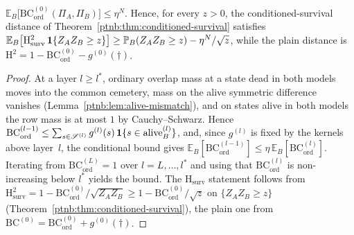 \begin{theoremenv}\label{ptnb:thm:rand-adf}\label{thm:rand_stopping}
$\mathbb{E}_B\bigl[\mathrm{BC}^{(0)}_{\mathrm{ord}}(\Pi_A, \Pi_B)\bigr] \leq \eta^{N}$.  Hence, for
every $z > 0$, the conditioned-survival distance of Theorem~\ref{ptnb:thm:conditioned-survival}
satisfies $\mathbb{E}_B\bigl[\mathrm{H}^2_{\mathrm{surv}}\,\mathbf{1}\{Z_A Z_B \allowbreak \geq z\}\bigr] \geq
    \mathbb{P}_B(Z_A Z_B \geq z) - \eta^{N}/\sqrt{z}$, while the plain distance is $\mathrm{H}^2 = 1 -
    \mathrm{BC}^{(0)}_{\mathrm{ord}} - g^{(0)}(\dagger)$.\end{theoremenv}

\begin{proof}
At a layer $l \geq l^*$, ordinary overlap mass at a state dead in both models moves into the common
cemetery, mass on the alive symmetric difference vanishes (Lemma~\ref{ptnb:lem:alive-mismatch}), and on
states alive in both models the row mass is at most $1$ by Cauchy--Schwarz.  Hence
$\mathrm{BC}^{(l-1)}_{\mathrm{ord}} \leq \sum_{s \in \mathscr{S}^{(l)}} g^{(l)}(s)\,\mathbf{1}\{s \in
    \mathrm{alive}^{(l)}_B\}$, and, since $g^{(l)}$ is fixed by the kernels above layer~$l$, the
conditional bound gives $\mathbb{E}_B[\mathrm{BC}^{(l-1)}_{\mathrm{ord}}] \leq
    \eta\,\mathbb{E}_B[\mathrm{BC}^{(l)}_{\mathrm{ord}}]$.  Iterating from
$\mathrm{BC}^{(L)}_{\mathrm{ord}} = 1$ over $l = L, \ldots, l^*$ and using that
$\mathrm{BC}^{(l)}_{\mathrm{ord}}$ is non-increasing below $l^*$ yields the bound.  The
$\mathrm{H}_{\mathrm{surv}}$ statement follows from $\mathrm{H}^2_{\mathrm{surv}} = 1 -
    \mathrm{BC}^{(0)}_{\mathrm{ord}}/\sqrt{Z_A Z_B} \geq 1 - \mathrm{BC}^{(0)}_{\mathrm{ord}}/\sqrt{z}$
on $\{Z_A Z_B \geq z\}$ (Theorem~\ref{ptnb:thm:conditioned-survival}), the plain one from
$\mathrm{BC}^{(0)} = \mathrm{BC}^{(0)}_{\mathrm{ord}} + g^{(0)}(\dagger)$.
\end{proof}

